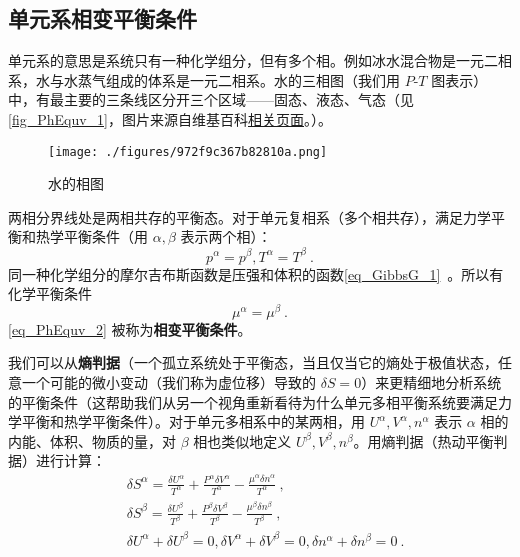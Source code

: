 \subsection{单元系相变平衡条件}
单元系的意思是系统只有一种化学组分，但有多个相。例如冰水混合物是一元二相系，水与水蒸气组成的体系是一元二相系。水的三相图（我们用 $P$-$T$ 图表示）中，有最主要的三条线区分开三个区域——固态、液态、气态（见\autoref{fig_PhEquv_1}，图片来源自维基百科\href{https://en.wikipedia.org/wiki/Triple_point}{相关页面}。）。
\begin{figure}[ht]
\centering
\texttt{[image: ./figures/972f9c367b82810a.png]}
\caption{水的相图} \label{fig_PhEquv_1}
\end{figure}

两相分界线处是两相共存的平衡态。对于单元复相系（多个相共存），满足力学平衡和热学平衡条件（用 $\alpha,\beta$ 表示两个相）：
\begin{equation}\label{eq_PhEquv_1}
p^{\alpha}=p^{\beta}, 
T^{\alpha}=T^{\beta}~.
\end{equation}
同一种化学组分的摩尔吉布斯函数是压强和体积的函数\autoref{eq_GibbsG_1}~。所以有化学平衡条件
\begin{equation}\label{eq_PhEquv_2}
\mu^{\alpha}=\mu^\beta~.
\end{equation}
\autoref{eq_PhEquv_2} 被称为\textbf{相变平衡条件}。

我们可以从\textbf{熵判据}（一个孤立系统处于平衡态，当且仅当它的熵处于极值状态，任意一个可能的微小变动（我们称为虚位移）导致的 $\delta S=0$）来更精细地分析系统的平衡条件（这帮助我们从另一个视角重新看待为什么单元多相平衡系统要满足力学平衡和热学平衡条件）。对于单元多相系中的某两相，用 $U^\alpha,V^\alpha,n^\alpha$ 表示 $\alpha$ 相的内能、体积、物质的量，对 $\beta$ 相也类似地定义 $U^\beta,V^\beta,n^\beta$。用熵判据（热动平衡判据）进行计算：
\begin{equation}
\begin{aligned}
&\delta S^\alpha=\frac{\delta U^\alpha}{T^\alpha}+\frac{P^\alpha\delta V^\alpha}{T^{\alpha}}-\frac{\mu^\alpha\delta n^\alpha}{T^{\alpha}}~,\\
&\delta S^\beta=\frac{\delta U^\beta}{T^\beta}+\frac{P^\beta\delta V^\beta}{T^{\beta}}-\frac{\mu^\beta\delta n^\beta}{T^{\beta}}~,\\
&\delta U^\alpha+\delta U^\beta=0,\delta V^\alpha+\delta V^\beta=0,\delta n^\alpha+\delta n^\beta=0~.
\end{aligned}
\end{equation}

